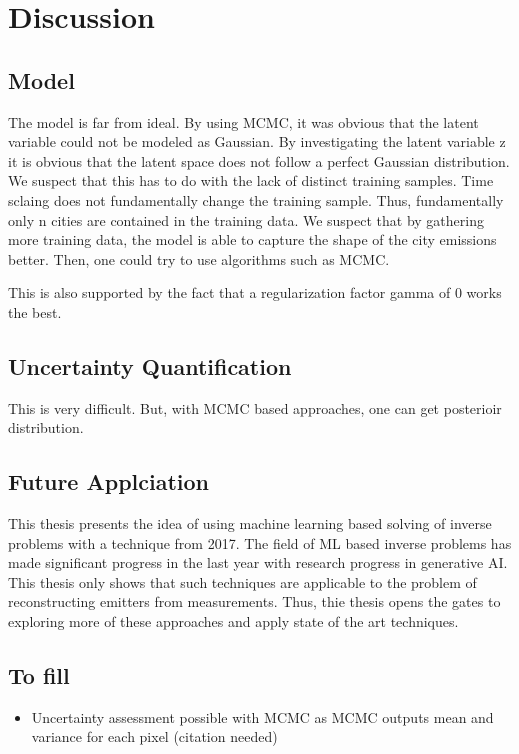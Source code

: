 
\chapter{Discussion}\label{chapter:discussion}

\section{Model}
The model is far from ideal.
By using MCMC, it was obvious that the latent variable could not be modeled as Gaussian.
By investigating the latent variable z it is obvious that the latent space does not follow a perfect Gaussian distribution.
We suspect that this has to do with the lack of distinct training samples.
Time sclaing does not fundamentally change the training sample.
Thus, fundamentally only n cities are contained in the training data.
We suspect that by gathering more training data, the model is able to capture the shape of the city emissions better.
Then, one could try to use algorithms such as MCMC.

This is also supported by the fact that a regularization factor \gls{gamma} of 0 works the best.

\section{Uncertainty Quantification}
This is very difficult.
But, with MCMC based approaches, one can get posterioir distribution.

\section{Future Applciation}
This thesis presents the idea of using machine learning based solving of inverse problems with a technique from 2017.
The field of ML based inverse problems has made significant progress in the last year with research progress in generative AI.
This thesis only shows that such techniques are applicable to the problem of reconstructing emitters from measurements.
Thus, thie thesis opens the gates to exploring more of these approaches and apply state of the art techniques.

\section{To fill}
\begin{itemize}
    \item Uncertainty assessment possible with MCMC as MCMC outputs mean and variance for each pixel (citation needed)
\end{itemize}
